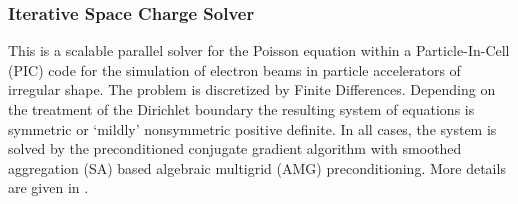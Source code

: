
\subsubsection{Iterative Space Charge Solver}
This is a scalable parallel solver for the Poisson equation
  within a Particle-In-Cell (PIC) code for the simulation of electron
  beams in particle accelerators of irregular shape.  The problem is
  discretized by Finite Differences.  Depending on the treatment of the
  Dirichlet boundary the resulting system of equations is symmetric or
  `mildly' nonsymmetric positive definite.  In all cases, the system is
  solved by the preconditioned conjugate gradient algorithm with
  smoothed aggregation (SA) based algebraic multigrid (AMG)
  preconditioning.  More details are given in \cite{Adelmann:2009p543}.
 
